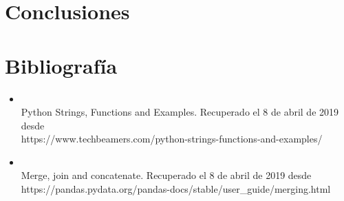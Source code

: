 \documentclass[letterpaper,12pt]{article}
\begin{document}
\section{Conclusiones}


\section*{Bibliografía}
\begin{itemize}

\item \\Python Strings, Functions and Examples. Recuperado el 8 de abril de 2019 desde \\https://www.techbeamers.com/python-strings-functions-and-examples/
\\

\item \\Merge, join and concatenate. Recuperado el 8 de abril de 2019 desde \\https://pandas.pydata.org/pandas-docs/stable/user\_guide/merging.html
\end{itemize}
\end{document}
